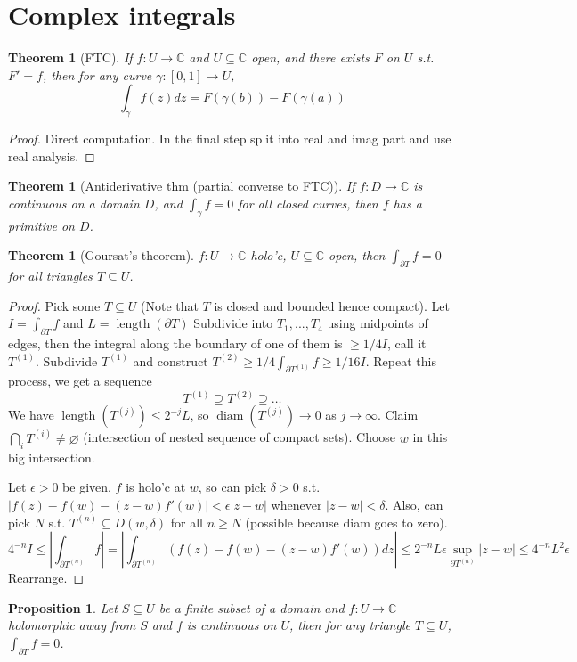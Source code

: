 \documentclass{article}
\theoremstyle{definition}
\theoremstyle{remark}
\theoremstyle{plain}
\newtheorem{thm}[defn]{Theorem}
\newtheorem{prop}[defn]{Proposition}
\newcommand{\CC}{\mathbb{C}}
\begin{document}
\section{Complex integrals}
\begin{thm}[FTC]
    If $f:U\to\CC$ and $U\subseteq \CC$ open, and there exists $F$ on $U$ s.t. $F'=f$, then for any curve $\gamma:[0,1]\to U$,
    \[\int_\gamma f(z)dz=F(\gamma(b))-F(\gamma(a))\]
\end{thm}
\begin{proof}
    Direct computation. In the final step split into real and imag part and use real analysis.
\end{proof}
\begin{thm}[Antiderivative thm (partial converse to FTC)]
If $f:D\to \CC$ is continuous on a domain $D$, and $\int_\gamma f=0$ for all closed curves, then $f$ has a primitive on $D$. 
\end{thm}
\begin{thm}[Goursat's theorem]
    $f:U\to\CC$ holo'c, $U\subseteq\CC$ open, then $\int_{\partial T}f=0$ for all triangles $T\subseteq U$.
\end{thm}
\begin{proof}
    Pick some $T\subseteq U$ (Note that $T$ is closed and bounded hence compact). Let $I=\int_{\partial T}f$ and $L=\operatorname{length}(\partial T)$
    Subdivide into $T_1,...,T_4$ using midpoints of edges, then the integral along the boundary of one of them is $\ge 1/4 I$, call it $T^{(1)}$. Subdivide $T^{(1)}$ and construct $T^{(2)}\ge 1/4\int_{\partial T^{(1)}}f\ge 1/16 I$. Repeat this process, we get a sequence
    \[T^{(1)}\supseteq T^{(2)}\supseteq\ldots\]
    We have $\operatorname{length}(T^{(j)})\le 2^{-j}L$, so $\operatorname{diam}(T^{(j)})\to 0$ as $j\to\infty$.
    Claim $\bigcap_i T^{(i)}\neq\varnothing$ (intersection of nested sequence of compact sets). Choose $w$ in this big intersection.

    Let $\epsilon>0$ be given. $f$ is holo'c at $w$, so can pick $\delta>0$ s.t. $|f(z)-f(w)-(z-w)f'(w)|<\epsilon|z-w|$ whenever $|z-w|<\delta$. Also, can pick $N$ s.t. $T^{(n)}\subseteq D(w,\delta)$ for all $n\ge N$ (possible because diam goes to zero).
    \[4^{-n}I\le\left|\int_{\partial T^{(n)}}f\right|=\left|\int_{\partial T^{(n)}}(f(z)-f(w)-(z-w)f'(w))dz\right|\le 2^{-n}L\epsilon\sup_{\partial T^{(n)}}|z-w|\le 4^{-n}L^2\epsilon\]
    Rearrange.
\end{proof}
\begin{prop}
    Let $S\subseteq U$ be a finite subset of a domain and $f:U\to \CC$ holomorphic away from $S$ and $f$ is continuous on $U$, then for any triangle $T\subseteq U$, $\int_{\partial T}f=0$.
\end{prop}
\end{document}
